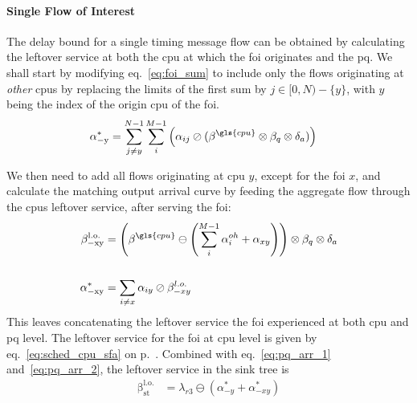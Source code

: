 \paragraph{Single Flow of Interest}
The delay bound for a single timing message flow can be obtained by calculating the leftover service at both the \gls{cpu} at which the \gls{foi}
originates and the \gls{pq}. We shall start by modifying eq.~\ref{eq:foi_sum} to include only the flows originating at \emph{other} \gls{cpu}s by replacing
the limits of the first sum by $j \in [0,N) - \{y\}$, with $y$ being the index of the origin \gls{cpu} of the \gls{foi}.
\begin{equation}
\begin{aligned}
\mathrm{\alpha^*_{-y}} &=  \sum_{j \neq y}^{N-1} \sum_i^{M-1} \left( \alpha_{ij} \oslash (\beta^{\gls{cpu}} \otimes \beta_q \otimes \delta_a) \right)
\label{eq:pq_arr_1}
\end{aligned}
\end{equation}
\par
We then need to add all flows originating at \gls{cpu} $y$, except for the \gls{foi} $x$, and calculate the matching output arrival curve by feeding
the aggregate flow through the \gls{cpu}s leftover service, after serving the \gls{foi}:
%
\begin{align}
\mathrm{\beta^{l.o.}_{-xy}} &=  \left( \beta^{\gls{cpu}}  \ominus  \left(\sum^{M-1}_{i} \alpha^{oh}_i + \alpha_{xy} \right) \right)  \otimes \beta_q \otimes \delta_a \\
\notag\\
\mathrm{\alpha^{*}_{-xy}} &= \sum_{i \neq x} \alpha_{iy} \oslash  \beta^{l.o.}_{-xy}\label{eq:pq_arr_2}
\end{align}
This leaves concatenating the leftover service the \gls{foi} experienced at both \gls{cpu} and \gls{pq} level. The leftover service for the \gls{foi} at \gls{cpu} level is given by eq.~\ref{eq:sched_cpu_sfa} on p.~\pageref{eq:sched_cpu_sfa}.
Combined with eq.~\ref{eq:pq_arr_1} and~\ref{eq:pq_arr_2}, the leftover service in the sink tree is
%
%
\begin{equation}
\begin{aligned}
\mathrm{\beta^{l.o.}_{st}} &= \lambda_{r3} \ominus (\alpha^*_{-y} + \alpha^{*}_{-xy})
\label{eq:lo_serv}
\end{aligned}
\end{equation}



